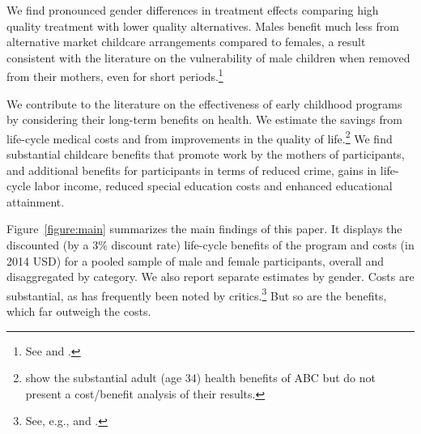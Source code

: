 We find pronounced gender differences in treatment effects comparing high quality treatment with lower quality alternatives. Males benefit much less from alternative market childcare arrangements compared to females, a result consistent with the literature on the vulnerability of male children when removed from their mothers, even for short periods.\footnote{See \citet{Kottelenberg-Lehrer_2014_Gender-Effects} and \citet{Baker_Gruber_Milligan_2015_Noncog_Defects}.}

We contribute to the literature on the effectiveness of early childhood programs by considering their long-term benefits on health. We estimate the savings from life-cycle medical costs and from improvements in the quality of life.\footnote{\cite{Campbell_Conti_etal_2014_EarlyChildhoodInvestments} show the substantial adult (age 34) health benefits of ABC but do not present a cost/benefit analysis of their results.} We find substantial childcare benefits that promote work by the mothers of participants, and additional benefits for participants in terms of reduced crime, gains in life-cycle labor income, reduced special education costs and enhanced educational attainment.

Figure~\ref{figure:main} summarizes the main findings of this paper. It displays the discounted (by a 3\% discount rate) life-cycle benefits of the program and costs (in 2014 USD) for a pooled sample of male and female participants, overall and disaggregated by category. We also report separate estimates by gender. Costs are substantial, as has frequently been noted by critics.\footnote{See, e.g., \citet{Whitehurst_2014_Senate_Testimony} and \citet{Fox_News_2014_Head_Start_Effects}.} But so are the benefits, which far outweigh the costs.

